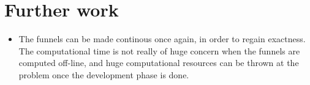 \chapter{Further work}

\begin{itemize}
  \item The funnels can be made continous once again, in order to regain
    exactness. The computational time is not really of huge concern when the
    funnels are computed off-line, and huge computational resources can be
    thrown at the problem once the development phase is done.
\end{itemize}